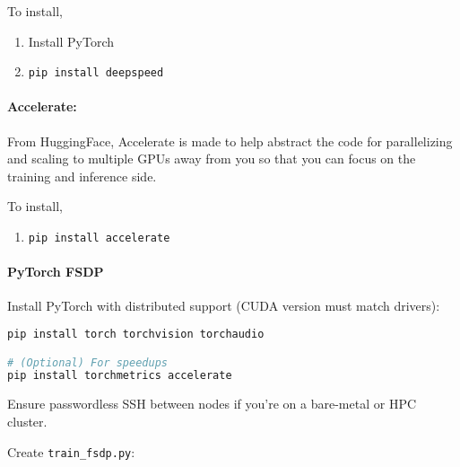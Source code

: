 To install,
\begin{enumerate}
	\item Install PyTorch
	\item \texttt{pip install deepspeed}
\end{enumerate}

\paragraph{Accelerate:} From HuggingFace, Accelerate is made to help abstract the code for parallelizing and scaling to multiple GPUs away from you so that you can focus on the training and inference side. 

To install,
\begin{enumerate}
	\item \texttt{pip install accelerate}
\end{enumerate}

\paragraph{PyTorch FSDP}

Install PyTorch with distributed support (CUDA version must match drivers):
\begin{lstlisting}[language=Python]
pip install torch torchvision torchaudio

# (Optional) For speedups
pip install torchmetrics accelerate
\end{lstlisting}

Ensure passwordless SSH between nodes if you're on a bare-metal or HPC cluster.

Create \texttt{train\_fsdp.py}:

